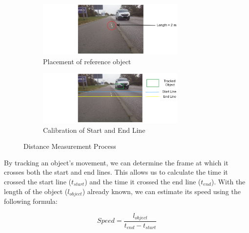 \begin{figure}[ht!]
    \centering
    \begin{subfigure}[c]{0.8\textwidth}
        \begin{minipage}{\textwidth}
            \centering
            \includegraphics[width=0.8\textwidth]{texs/Part2/chapter4/image/dist1.png}
        \end{minipage}
        \caption{Placement of reference object}
        \label{fig:dist_placement}
    \end{subfigure}
    \begin{subfigure}[c]{0.8\textwidth}
        \begin{minipage}{\textwidth}
            \centering
            \includegraphics[width=0.8\textwidth]{texs/Part2/chapter4/image/dist2.png}
        \end{minipage}
        \caption{Calibration of Start and End Line}
        \label{fig:dist_calibration}
    \end{subfigure}
    \caption{Distance Measurement Process}
    \label{fig:distance_measurement_process}
\end{figure}

By tracking an object's movement, we can determine the frame at which it crosses both the start and end lines. This allows us to calculate the time it crossed the start line ($t_{start}$) and the time it crossed the end line ($t_{end}$). With the length of the object ($l_{object}$) already known, we can estimate its speed using the following formula:

\begin{equation}
    Speed = \frac{l_{object}}{t_{end} - t_{start}}
\end{equation}

